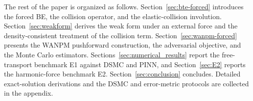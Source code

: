 \documentclass[11pt]{article}
\theoremstyle{plain}
\begin{document}


The rest of the paper is organized as follows. Section~\ref{sec:bte-forced} introduces the forced BE, the collision operator, and the elastic-collision involution. Section~\ref{sec:weakform} derives the weak form under an external force and the density-consistent treatment of the collision term. Section~\ref{sec:wanpm-forced} presents the WANPM pushforward construction, the adversarial objective, and the Monte Carlo estimators. Sections~\ref{sec:numerical_results}  report the free-transport benchmark E1 against DSMC and PINN, and Section~\ref{sec:E2} reports the harmonic-force benchmark E2. Section~\ref{sec:conclusion} concludes. Detailed exact-solution derivations and the DSMC and error-metric protocols are collected in the appendix.
\end{document}
